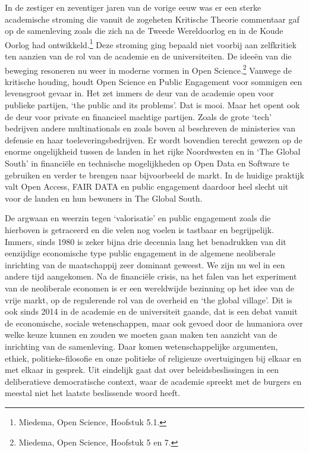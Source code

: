 \documentclass[empirical, authordate, ]{new-jote-article}
\begin{document}
	In de zestiger en zeventiger jaren van de vorige eeuw was er een sterke academische stroming die vanuit de zogeheten Kritische Theorie commentaar gaf op de samenleving zoals die zich na de Tweede Wereldoorlog en in de Koude Oorlog had ontwikkeld.\footnote{Miedema, Open Science, Hoofstuk 5.1.} Deze stroming ging bepaald niet voorbij aan zelfkritiek ten aanzien van de rol van de academie en de universiteiten. De ideeën van die beweging resoneren nu weer in moderne vormen in Open Science.\footnote{Miedema, Open Science, Hoofstuk 5 en 7.} Vanwege de kritische houding, houdt Open Science en Public Engagement voor sommigen een levensgroot gevaar in. Het zet immers de deur van de academie open voor publieke partijen, ‘the public and its problems'. Dat is mooi. Maar het opent ook de deur voor private en financieel machtige partijen. Zoals de grote ‘tech' bedrijven andere multinationals en zoals boven al beschreven de ministeries van defensie en haar toeleveringsbedrijven. Er wordt bovendien terecht gewezen op de enorme ongelijkheid tussen de landen in het rijke Noordwesten en in ‘The Global South' in financiële en technische mogelijkheden op Open Data en Software te gebruiken en verder te brengen naar bijvoorbeeld de markt. In de huidige praktijk valt Open Access, FAIR DATA en public engagement daardoor heel slecht uit voor de landen en hun bewoners in The Global South.



	De argwaan en weerzin tegen ‘valorisatie' en public engagement zoals die hierboven is getraceerd en die velen nog voelen is tastbaar en begrijpelijk. Immers, sinds 1980 is zeker bijna drie decennia lang het benadrukken van dit eenzijdige economische type public engagement in de algemene neoliberale inrichting van de maatschappij zeer dominant geweest. We zijn nu wel in een andere tijd aangekomen. Na de financiële crisis, na het falen van het experiment van de neoliberale economen is er een wereldwijde bezinning op het idee van de vrije markt, op de regulerende rol van de overheid en ‘the global village'. Dit is ook sinds 2014 in de academie en de universiteit gaande, dat is een debat vanuit de economische, sociale wetenschappen, maar ook gevoed door de humaniora over welke keuze kunnen en zouden we moeten gaan maken ten aanzicht van de inrichting van de samenleving. Daar komen wetenschappelijke argumenten, ethiek, politieke-filosofie en onze politieke of religieuze overtuigingen bij elkaar en met elkaar in gesprek. Uit eindelijk gaat dat over beleidsbeslissingen in een deliberatieve democratische context, waar de academie spreekt met de burgers en meestal niet het laatste beslissende woord heeft.
\end{document}
